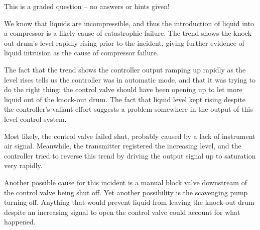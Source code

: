 
This is a graded question -- no answers or hints given!







We know that liquids are incompressible, and thus the introduction of liquid into a compressor is a likely cause of catastrophic failure.  The trend shows the knock-out drum's level rapidly rising prior to the incident, giving further evidence of liquid intrusion as the cause of compressor failure.

\vskip 10pt

The fact that the trend shows the controller output ramping up rapidly as the level rises tells us the controller was in automatic mode, and that it was trying to do the right thing: the control valve should have been opening up to let more liquid out of the knock-out drum.  The fact that liquid level kept rising despite the controller's valiant effort suggests a problem somewhere in the output of this level control system.

\vskip 10pt

Most likely, the control valve failed shut, probably caused by a lack of instrument air signal.  Meanwhile, the transmitter registered the increasing level, and the controller tried to reverse this trend by driving the output signal up to saturation very rapidly.

Another possible cause for this incident is a manual block valve downstream of the control valve being shut off.  Yet another possibility is the scavenging pump turning off.  Anything that would prevent liquid from leaving the knock-out drum despite an increasing signal to open the control valve could account for what happened.




